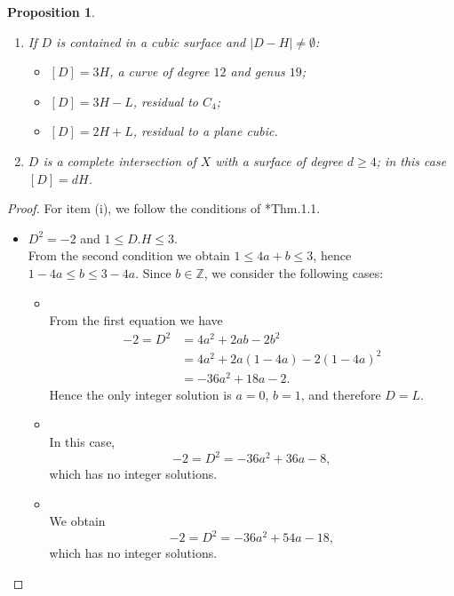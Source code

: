 \documentclass[12pt,reqno]{amsart}
\theoremstyle{plain}
\newtheorem{prop}[theorem]{Proposition}
\theoremstyle{definition}
\theoremstyle{remark}
\theoremstyle{definition}
\begin{document}
\begin{prop}
\begin{enumerate}[label=(\roman*)]
    \item If $D$ is contained in a cubic surface and $|D-H|\neq\emptyset$:
    \begin{itemize}
        \item[(a)] $[D]=3H$, a curve of degree $12$ and genus $19$;
        \item[(b)] $[D]=3H-L$, residual to $C_4$;
        \item[(c)] $[D]=2H+L$, residual to a plane cubic.
    \end{itemize}

    \item $D$ is a complete intersection of $X$ with a surface of degree $d\geq4$; in
    this case $[D]=dH$.
\end{enumerate}
\end{prop}
\begin{proof}
For item (i), we follow the conditions of \cite{kwa}*{Thm.1.1}.

\begin{itemize}
    \item $D^{2}=-2$ and $1\leq D.H\leq 3$.\\
    From the second condition we obtain
    $1\leq 4a+b\leq 3$, hence $1-4a\leq b\leq 3-4a$.
    Since $b\in\mathbb{Z}$, we consider the following cases:
    \begin{itemize}
        \item[$b=1-4a$] $ $\\
        From the first equation we have
        \begin{align*}
            -2=D^{2}
            &=4a^{2}+2ab-2b^{2}\\
            &=4a^{2}+2a(1-4a)-2(1-4a)^{2}\\
            &=-36a^{2}+18a-2.
        \end{align*}
        Hence the only integer solution is $a=0$, $b=1$, and therefore $D=L$.

        \item[$b=2-4a$] $ $\\
        In this case,
        \[
        -2=D^{2}=-36a^{2}+36a-8,
        \]
        which has no integer solutions.

        \item[$b=3-4a$] $ $\\
        We obtain
        \[
        -2=D^{2}=-36a^{2}+54a-18,
        \]
        which has no integer solutions.
    \end{itemize}


\end{itemize}
\end{proof}
\end{document}
